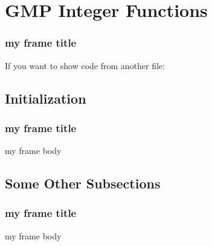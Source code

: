 \section{GMP Integer Functions}

\begin{frame}
\frametitle{my frame title}
If you want to show code from another file:
\end{frame}


\subsection{Initialization}

\begin{frame}
\frametitle{my frame title}
my frame body
\end{frame}


\subsection{Some Other Subsections}

\begin{frame}
\frametitle{my frame title}
my frame body
\end{frame}
